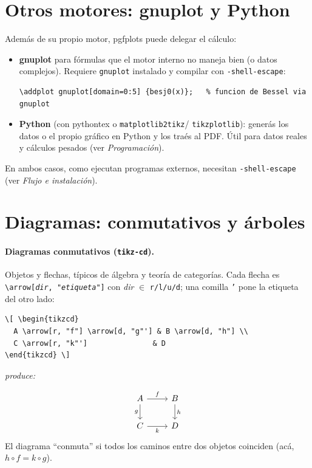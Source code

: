 \documentclass[11pt,a4paper]{article}
\newcommand{\C}[1]{\texttt{\textbackslash #1}}
\newcommand{\pkg}[1]{\textsf{#1}}
\newcommand{\produce}{\par\smallskip\noindent\textit{produce:}\par\smallskip}
\begin{document}
\section{Otros motores: gnuplot y Python}
Además de su propio motor, \pkg{pgfplots} puede delegar el cálculo:
\begin{itemize}[leftmargin=*]
  \item \textbf{gnuplot} para fórmulas que el motor interno no maneja bien (o datos
        complejos). Requiere \texttt{gnuplot} instalado y compilar con
        \texttt{-shell-escape}:
\begin{lstlisting}
\addplot gnuplot[domain=0:5] {besj0(x)};   % funcion de Bessel via gnuplot
\end{lstlisting}
  \item \textbf{Python} (con \pkg{pythontex} o \texttt{matplotlib2tikz}/
        \texttt{tikzplotlib}): generás los datos o el propio gráfico en Python y
        los traés al PDF. Útil para datos reales y cálculos pesados (ver
        \emph{Programación}).
\end{itemize}
En ambos casos, como ejecutan programas externos, necesitan \texttt{-shell-escape}
(ver \emph{Flujo e instalación}).

\section{Diagramas: conmutativos y árboles}
\paragraph{Diagramas conmutativos (\texttt{tikz-cd}).} Objetos y flechas, típicos
de álgebra y teoría de categorías. Cada flecha es \C{arrow[\textit{dir},
"\textit{etiqueta}"]} con \textit{dir} $\in$ \texttt{r/l/u/d}; una comilla
\texttt{'} pone la etiqueta del otro lado:
\begin{lstlisting}
\[ \begin{tikzcd}
  A \arrow[r, "f"] \arrow[d, "g"'] & B \arrow[d, "h"] \\
  C \arrow[r, "k"']               & D
\end{tikzcd} \]
\end{lstlisting}
\produce
\[ \begin{tikzcd}
  A \arrow[r, "f"] \arrow[d, "g"'] & B \arrow[d, "h"] \\
  C \arrow[r, "k"']               & D
\end{tikzcd} \]
El diagrama \enquote{conmuta} si todos los caminos entre dos objetos coinciden
(acá, $h\circ f = k\circ g$).
\end{document}
